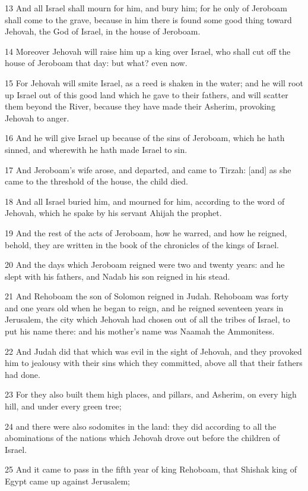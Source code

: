 \par 13 And all Israel shall mourn for him, and bury him; for he only of Jeroboam shall come to the grave, because in him there is found some good thing toward Jehovah, the God of Israel, in the house of Jeroboam.
\par 14 Moreover Jehovah will raise him up a king over Israel, who shall cut off the house of Jeroboam that day: but what? even now.
\par 15 For Jehovah will smite Israel, as a reed is shaken in the water; and he will root up Israel out of this good land which he gave to their fathers, and will scatter them beyond the River, because they have made their Asherim, provoking Jehovah to anger.
\par 16 And he will give Israel up because of the sins of Jeroboam, which he hath sinned, and wherewith he hath made Israel to sin.
\par 17 And Jeroboam's wife arose, and departed, and came to Tirzah: [and] as she came to the threshold of the house, the child died.
\par 18 And all Israel buried him, and mourned for him, according to the word of Jehovah, which he spake by his servant Ahijah the prophet.
\par 19 And the rest of the acts of Jeroboam, how he warred, and how he reigned, behold, they are written in the book of the chronicles of the kings of Israel.
\par 20 And the days which Jeroboam reigned were two and twenty years: and he slept with his fathers, and Nadab his son reigned in his stead.
\par 21 And Rehoboam the son of Solomon reigned in Judah. Rehoboam was forty and one years old when he began to reign, and he reigned seventeen years in Jerusalem, the city which Jehovah had chosen out of all the tribes of Israel, to put his name there: and his mother's name was Naamah the Ammonitess.
\par 22 And Judah did that which was evil in the sight of Jehovah, and they provoked him to jealousy with their sins which they committed, above all that their fathers had done.
\par 23 For they also built them high places, and pillars, and Asherim, on every high hill, and under every green tree;
\par 24 and there were also sodomites in the land: they did according to all the abominations of the nations which Jehovah drove out before the children of Israel.
\par 25 And it came to pass in the fifth year of king Rehoboam, that Shishak king of Egypt came up against Jerusalem;
